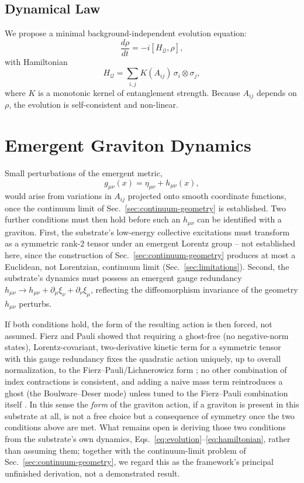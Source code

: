 \documentclass[11pt]{article}
\begin{document}
\subsection{Dynamical Law}

We propose a minimal background-independent evolution equation:
\begin{equation}
\frac{d\rho}{dt} = -i[H_\mathcal{Q}, \rho],
\label{eq:evolution}
\end{equation}
with Hamiltonian
\begin{equation}
H_\mathcal{Q} = \sum_{i,j} K(A_{ij})\, \sigma_i \otimes \sigma_j,
\label{eq:hamiltonian}
\end{equation}
where $K$ is a monotonic kernel of entanglement strength. Because $A_{ij}$ depends on $\rho$, the evolution is self-consistent and non-linear.

\section{Emergent Graviton Dynamics}

Small perturbations of the emergent metric,
\begin{equation}
g_{\mu\nu}(x) = \eta_{\mu\nu} + h_{\mu\nu}(x),
\label{eq:perturbation}
\end{equation}
would arise from variations in $A_{ij}$ projected onto smooth coordinate functions, once the continuum limit of Sec.~\ref{sec:continuum-geometry} is established. Two further conditions must then hold before such an $h_{\mu\nu}$ can be identified with a graviton. First, the substrate's low-energy collective excitations must transform as a symmetric rank-2 tensor under an emergent Lorentz group -- not established here, since the construction of Sec.~\ref{sec:continuum-geometry} produces at most a Euclidean, not Lorentzian, continuum limit (Sec.~\ref{sec:limitations}). Second, the substrate's dynamics must possess an emergent gauge redundancy $h_{\mu\nu} \to h_{\mu\nu} + \partial_\mu \xi_\nu + \partial_\nu \xi_\mu$, reflecting the diffeomorphism invariance of the geometry $h_{\mu\nu}$ perturbs.

If both conditions hold, the form of the resulting action is then forced, not assumed. Fierz and Pauli showed that requiring a ghost-free (no negative-norm states), Lorentz-covariant, two-derivative kinetic term for a symmetric tensor with this gauge redundancy fixes the quadratic action uniquely, up to overall normalization, to the Fierz--Pauli/Lichnerowicz form \cite{FierzPauli}; no other combination of index contractions is consistent, and adding a naive mass term reintroduces a ghost (the Boulware--Deser mode) unless tuned to the Fierz--Pauli combination itself \cite{Hinterbichler}. In this sense the \emph{form} of the graviton action, if a graviton is present in this substrate at all, is not a free choice but a consequence of symmetry once the two conditions above are met. What remains open is deriving those two conditions from the substrate's own dynamics, Eqs.~\eqref{eq:evolution}--\eqref{eq:hamiltonian}, rather than assuming them; together with the continuum-limit problem of Sec.~\ref{sec:continuum-geometry}, we regard this as the framework's principal unfinished derivation, not a demonstrated result.
\end{document}
